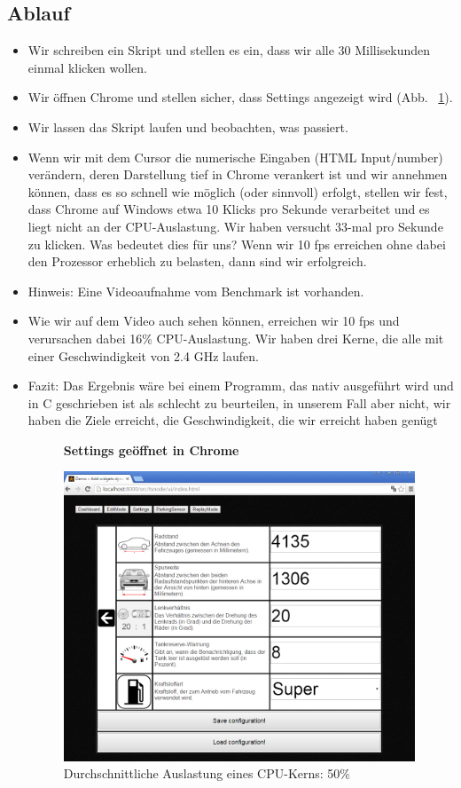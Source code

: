 \documentclass[qualitaetssicherung.tex]{subfiles}
\begin{document}
	\subsection{Ablauf}
	\begin{itemize}
	\item Wir schreiben ein Skript und stellen es ein, dass wir alle 30 Millisekunden einmal klicken wollen.
	\item Wir öffnen Chrome und stellen sicher, dass Settings angezeigt wird (Abb. ~\ref{settings_speedtest}).
	\item Wir lassen das Skript laufen und beobachten, was passiert.
	\item Wenn wir mit dem Cursor die numerische Eingaben (HTML Input/number) verändern, deren Darstellung tief in Chrome verankert ist und wir annehmen können, dass es so schnell wie möglich (oder sinnvoll) erfolgt, stellen wir fest, dass Chrome auf Windows etwa 10 Klicks pro Sekunde verarbeitet und es liegt nicht an der CPU-Auslastung. Wir haben versucht 33-mal pro Sekunde zu klicken. Was bedeutet dies für uns? Wenn wir 10 fps erreichen ohne dabei den Prozessor erheblich zu belasten, dann sind wir erfolgreich.
	\item Hinweis: Eine Videoaufnahme vom Benchmark ist vorhanden.
	\item Wie wir auf dem Video auch sehen können, erreichen wir 10 fps und verursachen dabei 16\% CPU-Auslastung. Wir haben drei Kerne, die alle mit einer Geschwindigkeit von 2.4 GHz laufen.
	\item Fazit: Das Ergebnis wäre bei einem Programm, das nativ ausgeführt wird und in C geschrieben ist als schlecht zu beurteilen, in unserem Fall aber nicht, wir haben die Ziele erreicht, die Geschwindigkeit, die wir erreicht haben genügt
	
	\begin{figure}[H]
    \textbf{Settings geöffnet in Chrome}\par\medskip
    \includegraphics[width=0.99\textwidth]{Images/settings-speedtest.png}
    \caption{Durchschnittliche Auslastung eines CPU-Kerns: 50\%}
		\label{settings_speedtest}
	\end{figure}
	\end{itemize}
	
\end{document}
